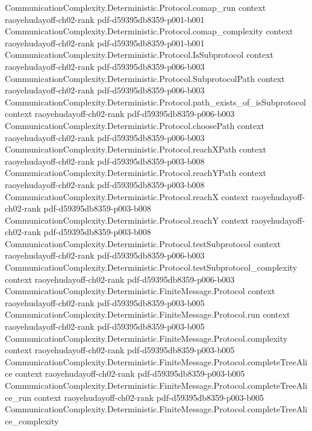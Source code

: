 \begin{theorem}
\proofstep
  {CommunicationComplexity.Deterministic.Protocol.comap_run}
  {context}
  {raoyehudayoff-ch02-rank}
  {pdf-d59395db8359-p001-b001}
\proofstep
  {CommunicationComplexity.Deterministic.Protocol.comap_complexity}
  {context}
  {raoyehudayoff-ch02-rank}
  {pdf-d59395db8359-p001-b001}
\proofstep
  {CommunicationComplexity.Deterministic.Protocol.IsSubprotocol}
  {context}
  {raoyehudayoff-ch02-rank}
  {pdf-d59395db8359-p006-b003}
\proofstep
  {CommunicationComplexity.Deterministic.Protocol.SubprotocolPath}
  {context}
  {raoyehudayoff-ch02-rank}
  {pdf-d59395db8359-p006-b003}
\proofstep
  {CommunicationComplexity.Deterministic.Protocol.path_exists_of_isSubprotocol}
  {context}
  {raoyehudayoff-ch02-rank}
  {pdf-d59395db8359-p006-b003}
\proofstep
  {CommunicationComplexity.Deterministic.Protocol.choosePath}
  {context}
  {raoyehudayoff-ch02-rank}
  {pdf-d59395db8359-p006-b003}
\proofstep
  {CommunicationComplexity.Deterministic.Protocol.reachXPath}
  {context}
  {raoyehudayoff-ch02-rank}
  {pdf-d59395db8359-p003-b008}
\proofstep
  {CommunicationComplexity.Deterministic.Protocol.reachYPath}
  {context}
  {raoyehudayoff-ch02-rank}
  {pdf-d59395db8359-p003-b008}
\proofstep
  {CommunicationComplexity.Deterministic.Protocol.reachX}
  {context}
  {raoyehudayoff-ch02-rank}
  {pdf-d59395db8359-p003-b008}
\proofstep
  {CommunicationComplexity.Deterministic.Protocol.reachY}
  {context}
  {raoyehudayoff-ch02-rank}
  {pdf-d59395db8359-p003-b008}
\proofstep
  {CommunicationComplexity.Deterministic.Protocol.testSubprotocol}
  {context}
  {raoyehudayoff-ch02-rank}
  {pdf-d59395db8359-p006-b003}
\proofstep
  {CommunicationComplexity.Deterministic.Protocol.testSubprotocol_complexity}
  {context}
  {raoyehudayoff-ch02-rank}
  {pdf-d59395db8359-p006-b003}
\proofstep
  {CommunicationComplexity.Deterministic.FiniteMessage.Protocol}
  {context}
  {raoyehudayoff-ch02-rank}
  {pdf-d59395db8359-p003-b005}
\proofstep
  {CommunicationComplexity.Deterministic.FiniteMessage.Protocol.run}
  {context}
  {raoyehudayoff-ch02-rank}
  {pdf-d59395db8359-p003-b005}
\proofstep
  {CommunicationComplexity.Deterministic.FiniteMessage.Protocol.complexity}
  {context}
  {raoyehudayoff-ch02-rank}
  {pdf-d59395db8359-p003-b005}
\proofstep
  {CommunicationComplexity.Deterministic.FiniteMessage.Protocol.completeTreeAlice}
  {context}
  {raoyehudayoff-ch02-rank}
  {pdf-d59395db8359-p003-b005}
\proofstep
  {CommunicationComplexity.Deterministic.FiniteMessage.Protocol.completeTreeAlice_run}
  {context}
  {raoyehudayoff-ch02-rank}
  {pdf-d59395db8359-p003-b005}
\proofstep
  {CommunicationComplexity.Deterministic.FiniteMessage.Protocol.completeTreeAlice_complexity}

\end{theorem}
